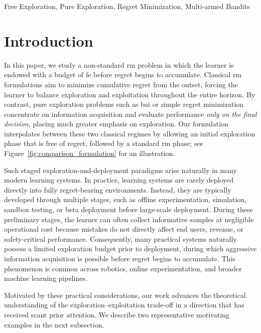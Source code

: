\documentclass[twoside,11pt]{article}
\begin{document}
\begin{keywords}
  Free Exploration, Pure Exploration, Regret Minimization, Multi-armed Bandits
\end{keywords}

\section{Introduction}\label{sec:intro}
In this paper, we study a non-standard \ac{rm} problem in which the learner is endowed with a budget of \ac{fe} before regret begins to accumulate. Classical \ac{rm} formulations aim to minimize cumulative regret from the outset, forcing the learner to balance exploration and exploitation throughout the entire horizon. By contrast, pure exploration problems such as \ac{bai} or simple regret minimization concentrate on information acquisition and evaluate performance {\em only on the final decision}, placing much greater emphasis on exploration. Our formulation   interpolates between these two classical regimes by allowing an initial exploration phase that is free of regret, followed by a standard \ac{rm} phase; see Figure~\ref{fig:comparison_formulation} for an illustration.

 Such staged exploration-and-deployment paradigms arise naturally in many modern learning systems. In practice, learning systems are rarely deployed directly into fully regret-bearing environments. Instead, they are typically developed through multiple stages, such as offline experimentation, simulation, sandbox testing, or beta deployment  before large-scale deployment. During these preliminary stages, the learner can often collect informative samples at negligible operational cost because mistakes do not directly affect end users, revenue, or safety-critical performance. Consequently, many practical systems naturally possess a limited exploration budget prior to deployment, during which aggressive information acquisition is possible before regret begins to accumulate. This phenomenon is common across robotics,  online experimentation, and broader machine learning pipelines.

Motivated by these practical considerations, our work advances the theoretical understanding of the exploration–exploitation trade-off in a direction that has received scant prior attention. We describe two representative motivating examples in the next subsection.
\end{document}
